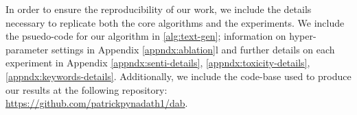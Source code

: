 In order to ensure the reproducibility of our work, we include the details necessary to replicate both the core algorithms and the experiments. 
We include the psuedo-code for our algorithm in \ref{alg:text-gen}; information on hyper-parameter settings in Appendix \ref{appndx:ablation}l and further details on each experiment in Appendix \ref{appndx:senti-details}, \ref{appndx:toxicity-details}, \ref{appndx:keywords-details}. Additionally, we include the code-base used to produce our results at the following repository: \url{https://github.com/patrickpynadath1/dab}.  